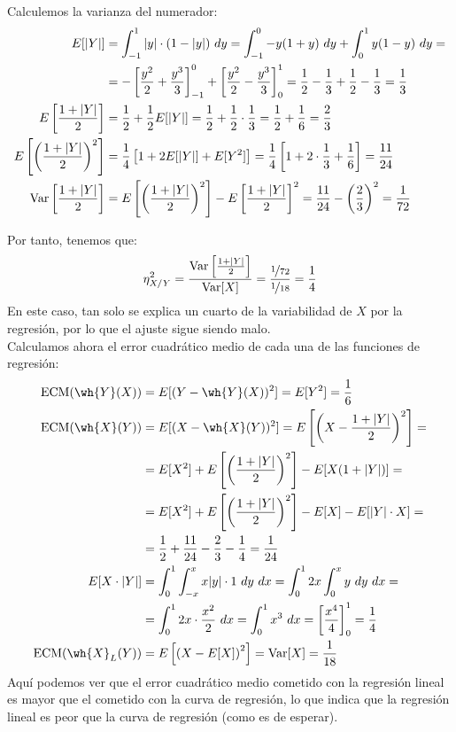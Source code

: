\begin{ejercicio}
    Calculemos la varianza del numerador:
    \begin{align*}
        E[|Y|] &= \int_{-1}^{1} |y|\cdot (1-|y|) \ dy = \int_{-1}^{0} -y(1+y) \ dy + \int_{0}^{1} y(1-y) \ dy
        =\\&= -\left[\dfrac{y^2}{2}+\dfrac{y^3}{3}\right]_{-1}^{0} + \left[\dfrac{y^2}{2}-\dfrac{y^3}{3}\right]_{0}^{1}
        = \dfrac{1}{2}-\dfrac{1}{3}+\dfrac{1}{2}-\dfrac{1}{3} = \dfrac{1}{3}\\
        E\left[\dfrac{1+|Y|}{2}\right] &= \frac{1}{2}+\frac{1}{2}E[|Y|]=\frac{1}{2}+\frac{1}{2}\cdot \frac{1}{3} = \frac{1}{2}+\frac{1}{6} = \frac{2}{3}\\
        E\left[\left(\dfrac{1+|Y|}{2}\right)^2\right] &= \dfrac{1}{4}\left[1+2E[|Y|]+E[Y^2]\right]
        = \dfrac{1}{4}\left[1+2\cdot \frac{1}{3}+\frac{1}{6}\right] = \dfrac{11}{24}\\
        \operatorname{Var}\left[\dfrac{1+|Y|}{2}\right] &= E\left[\left(\dfrac{1+|Y|}{2}\right)^2\right]-E\left[\dfrac{1+|Y|}{2}\right]^2
        = \dfrac{11}{24}-\left(\dfrac{2}{3}\right)^2 = \dfrac{1}{72}
    \end{align*}

    Por tanto, tenemos que:
    \begin{equation*}
        \eta_{X/Y}^2 = \dfrac{\operatorname{Var}\left[\frac{1+|Y|}{2}\right]}{\operatorname{Var}[X]} = \dfrac{\nicefrac{1}{72}}{\nicefrac{1}{18}} = \dfrac{1}{4}
    \end{equation*}
    En este caso, tan solo se explica un cuarto de la variabilidad de $X$ por la regresión, por lo que el ajuste sigue siendo malo.\\

    Calculamos ahora el error cuadrático medio de cada una de las funciones de regresión:
    \begin{align*}
        \text{ECM}(\wh{Y}(X)) &= E[(Y-\wh{Y}(X))^2] = E[Y^2] = \dfrac{1}{6}\\
        \text{ECM}(\wh{X}(Y)) &= E[(X-\wh{X}(Y))^2] = E\left[\left(X-\dfrac{1+|Y|}{2}\right)^2\right] =\\&= E[X^2] + E\left[\left(\dfrac{1+|Y|}{2}\right)^2\right] - E[X(1+|Y|)]
        =\\&= E[X^2] + E\left[\left(\dfrac{1+|Y|}{2}\right)^2\right] - E[X] - E[|Y|\cdot X]
        =\\&= \dfrac{1}{2}+\dfrac{11}{24}-\dfrac{2}{3}- \dfrac{1}{4} = \dfrac{1}{24}\\
        E[X\cdot |Y|] &= \int_{0}^1\int_{-x}^{x} x|y|\cdot 1 \ dy \ dx = \int_{0}^1 2x\int_0^x y \ dy \ dx
        =\\&= \int_{0}^1 2x\cdot \frac{x^2}{2} \ dx = \int_{0}^1 x^3 \ dx = \left[\frac{x^4}{4}\right]_0^1 = \frac{1}{4}\\
        \text{ECM}(\wh{X}_L(Y)) &= E\left[\left(X-E[X]\right)^2\right] = \Var[X] = \dfrac{1}{18}
    \end{align*}
    Aquí podemos ver que el error cuadrático medio cometido con la regresión lineal es mayor que el cometido con la curva de regresión, lo que indica que la regresión lineal es peor que la curva de regresión (como es de esperar).
\end{ejercicio}

